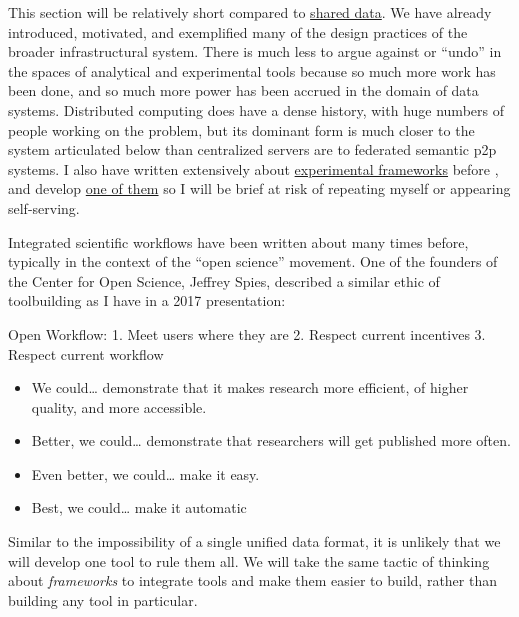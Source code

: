 This section will be relatively short compared to
\protect\hyperlink{shared-data}{shared data}. We have already
introduced, motivated, and exemplified many of the design practices of
the broader infrastructural system. There is much less to argue against
or ``undo'' in the spaces of analytical and experimental tools because
so much more work has been done, and so much more power has been accrued
in the domain of data systems. Distributed computing does have a dense
history, with huge numbers of people working on the problem, but its
dominant form is much closer to the system articulated below than
centralized servers are to federated semantic p2p systems. I also have
written extensively about
\protect\hyperlink{experimental-frameworks}{experimental frameworks}
before \citep{saundersAutopilotAutomatingBehavioral2019} , and
develop \href{https://docs.auto-pi-lot.com/en/latest/}{one of them} so I
will be brief at risk of repeating myself or appearing self-serving.

Integrated scientific workflows have been written about many times
before, typically in the context of the ``open science'' movement. One
of the founders of the Center for Open Science, Jeffrey Spies, described
a similar ethic of toolbuilding as I have in a 2017 presentation:

\begin{leftbar}
Open Workflow: 1. Meet users where they are 2. Respect current
incentives 3. Respect current workflow

\begin{itemize}

\item
  We could\ldots{} demonstrate that it makes research more efficient, of
  higher quality, and more accessible.
\item
  Better, we could\ldots{} demonstrate that researchers will get
  published more often.
\item
  Even better, we could\ldots{} make it easy.
\item
  Best, we could\ldots{} make it automatic \citep{spiesWorkflowCentricApproachIncreasing2017} 
\end{itemize}
\end{leftbar}

Similar to the impossibility of a single unified data format, it is
unlikely that we will develop one tool to rule them all. We will take
the same tactic of thinking about \emph{frameworks} to integrate tools
and make them easier to build, rather than building any tool in
particular.

